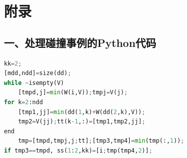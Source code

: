 \chapter{附录}

\section*{一、处理碰撞事例的Python代码}
\begin{lstlisting}[language=python]
kk=2;
[mdd,ndd]=size(dd);
while ~isempty(V)
    [tmpd,j]=min(W(i,V));tmpj=V(j);
for k=2:ndd
    [tmp1,jj]=min(dd(1,k)+W(dd(2,k),V));
    tmp2=V(jj);tt(k-1,:)=[tmp1,tmp2,jj];
end
    tmp=[tmpd,tmpj,j;tt];[tmp3,tmp4]=min(tmp(:,1));
if tmp3==tmpd, ss(1:2,kk)=[i;tmp(tmp4,2)];
 \end{lstlisting}